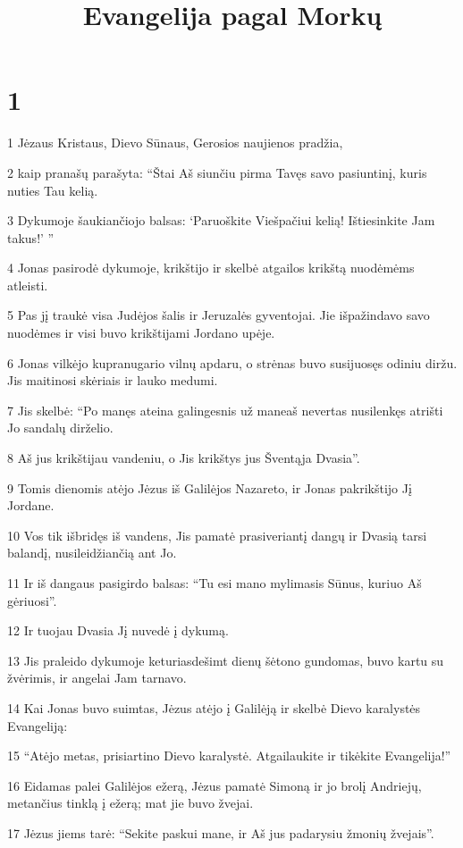

\title{Evangelija pagal Morkų}

\chapter{1}


\par 1 Jėzaus Kristaus, Dievo Sūnaus, Gerosios naujienos pradžia, 
\par 2 kaip pranašų parašyta: “Štai Aš siunčiu pirma Tavęs savo pasiuntinį, kuris nuties Tau kelią. 
\par 3 Dykumoje šaukiančiojo balsas: ‘Paruoškite Viešpačiui kelią! Ištiesinkite Jam takus!’ ” 
\par 4 Jonas pasirodė dykumoje, krikštijo ir skelbė atgailos krikštą nuodėmėms atleisti. 
\par 5 Pas jį traukė visa Judėjos šalis ir Jeruzalės gyventojai. Jie išpažindavo savo nuodėmes ir visi buvo krikštijami Jordano upėje. 
\par 6 Jonas vilkėjo kupranugario vilnų apdaru, o strėnas buvo susijuosęs odiniu diržu. Jis maitinosi skėriais ir lauko medumi. 
\par 7 Jis skelbė: “Po manęs ateina galingesnis už mane­aš nevertas nusilenkęs atrišti Jo sandalų dirželio. 
\par 8 Aš jus krikštijau vandeniu, o Jis krikštys jus Šventąja Dvasia”. 
\par 9 Tomis dienomis atėjo Jėzus iš Galilėjos Nazareto, ir Jonas pakrikštijo Jį Jordane. 
\par 10 Vos tik išbridęs iš vandens, Jis pamatė prasiveriantį dangų ir Dvasią tarsi balandį, nusileidžiančią ant Jo. 
\par 11 Ir iš dangaus pasigirdo balsas: “Tu esi mano mylimasis Sūnus, kuriuo Aš gėriuosi”. 
\par 12 Ir tuojau Dvasia Jį nuvedė į dykumą. 
\par 13 Jis praleido dykumoje keturiasdešimt dienų šėtono gundomas, buvo kartu su žvėrimis, ir angelai Jam tarnavo. 
\par 14 Kai Jonas buvo suimtas, Jėzus atėjo į Galilėją ir skelbė Dievo karalystės Evangeliją: 
\par 15 “Atėjo metas, prisiartino Dievo karalystė. Atgailaukite ir tikėkite Evangelija!” 
\par 16 Eidamas palei Galilėjos ežerą, Jėzus pamatė Simoną ir jo brolį Andriejų, metančius tinklą į ežerą; mat jie buvo žvejai. 
\par 17 Jėzus jiems tarė: “Sekite paskui mane, ir Aš jus padarysiu žmonių žvejais”. 
